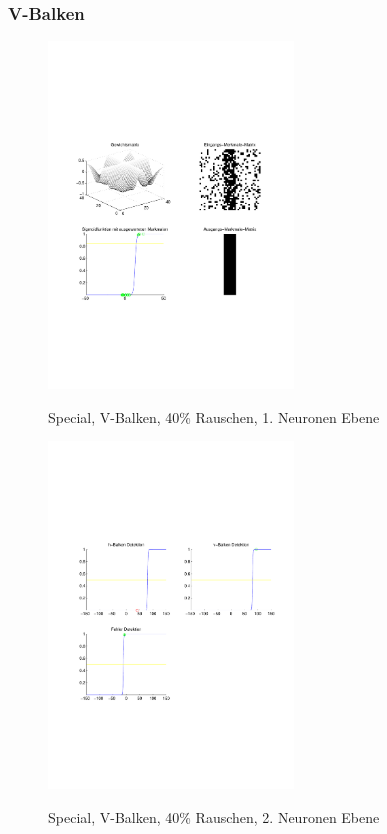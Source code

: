 \subsubsection{V-Balken}
\begin{figure}[hbt]
	\begin{minipage}[c]{\textwidth}
		\centering
       	\includegraphics[trim=71 213 43 212, clip, width=0.58\textwidth]{./Bilder/Auswertung/Endergebnis/TypeSpecial_Rauschen40_V_Line_Layer1}
		\caption{Special, V-Balken, 40\% Rauschen, 1. Neuronen Ebene}
		\label{Special_V_40_1}
		\vfill
		\includegraphics[trim=71 213 43 212, clip, width=0.58\textwidth]{./Bilder/Auswertung/Endergebnis/TypeSpecial_Rauschen40_v_Line_Layer2}
		\caption{Special, V-Balken, 40\% Rauschen, 2. Neuronen Ebene}
		\label{Special_V_40_2}
	\end{minipage}
\end{figure}

